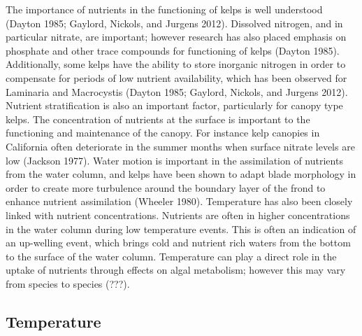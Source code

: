 \documentclass[]{article}
\begin{document}
The importance of nutrients in the functioning of kelps is well
understood (Dayton 1985; Gaylord, Nickols, and Jurgens 2012). Dissolved
nitrogen, and in particular nitrate, are important; however research has
also placed emphasis on phosphate and other trace compounds for
functioning of kelps (Dayton 1985). Additionally, some kelps have the
ability to store inorganic nitrogen in order to compensate for periods
of low nutrient availability, which has been observed for Laminaria and
Macrocystis (Dayton 1985; Gaylord, Nickols, and Jurgens 2012). Nutrient
stratification is also an important factor, particularly for canopy type
kelps. The concentration of nutrients at the surface is important to the
functioning and maintenance of the canopy. For instance kelp canopies in
California often deteriorate in the summer months when surface nitrate
levels are low (Jackson 1977). Water motion is important in the
assimilation of nutrients from the water column, and kelps have been
shown to adapt blade morphology in order to create more turbulence
around the boundary layer of the frond to enhance nutrient assimilation
(Wheeler 1980). Temperature has also been closely linked with nutrient
concentrations. Nutrients are often in higher concentrations in the
water column during low temperature events. This is often an indication
of an up-welling event, which brings cold and nutrient rich waters from
the bottom to the surface of the water column. Temperature can play a
direct role in the uptake of nutrients through effects on algal
metabolism; however this may vary from species to species (???).

\hypertarget{temperature}{%
\subsection{Temperature}\label{temperature}}
\end{document}
